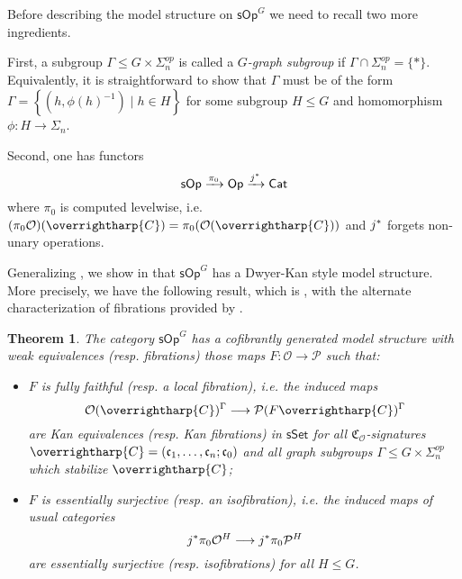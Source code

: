 \documentclass[a4paper,10pt
,draft
]{article}%
\numberwithin{equation}{section}
\numberwithin{figure}{section}
\newtheorem{theorem}[equation]{Theorem}%
\theoremstyle{definition} %
\newcommand{\sets}[2]{\left\{ #1 \;|\; #2\right\}}%
\newcommand{\longto}{\longrightarrow}%
\newcommand{\vect}[1]{\text{\overrightharp{\ensuremath{#1}}}}
\newcommand{\sSet}{\ensuremath{\mathsf{sSet}}}%
\newcommand{\sOp}{\ensuremath{\mathsf{sOp}}}%
\renewcommand{\O}{\ensuremath{\mathcal O}}
\renewcommand{\P}{\ensuremath{\mathcal P}}
\newcommand{\1}{\ensuremath{\mathbbm 1}}%
\begin{document}
Before describing the model structure on $\mathsf{sOp}^G$
we need to recall two more ingredients.

First, 
a subgroup $\Gamma \leq G \times \Sigma_n^{op}$
is called a \emph{$G$-graph subgroup}
if $\Gamma \cap \Sigma_n^{op} = \{*\}$.
Equivalently, it is straightforward to show
that $\Gamma$ must be of the form 
$\Gamma = \sets{(h,\phi(h)^{-1})}{h \in H}$
for some subgroup $H \leq G$
and homomorphism $\phi \colon H \to \Sigma_n$.

Second, one has functors
\[
	\mathsf{sOp} \xrightarrow{\pi_0}
	\mathsf{Op} \xrightarrow{j^{\**}}
	\mathsf{Cat}
\]
where $\pi_0$ is computed levelwise,
i.e. 
$(\pi_0 \O)(\vect{C}) = 
\pi_0(\O(\vect{C}))$
and
$j^{\**}$ forgets non-unary operations.


Generalizing \cite{Ber07b,CM13b},
we show in \cite{BP_HGOP}
that $\mathsf{sOp}^G$ 
has a Dwyer-Kan style model structure.
More precisely, we have the following result, which is
\cite[Thm. III]{BP_HGOP},
with the alternate characterization of fibrations 
provided by 
\cite[Prop. 4.78]{BP_HGOP}.



\begin{theorem}\label{SOPG_THM}
      The category $\sOp^G$ has a cofibrantly generated model structure with weak equivalences (resp. fibrations) those maps
      $F \colon \O \to \P$ such that:
\begin{itemize}
\item $F$ is \emph{fully faithful} (resp. a \emph{local fibration}), i.e. the induced maps
	\begin{equation}\label{DKEQUIV_EQ}
		\O ( \vect{C})^\Gamma \longto 
		\P(F \vect{C})^\Gamma
	\end{equation}
	are Kan equivalences (resp. Kan fibrations) in $\sSet$
	for all $\mathfrak C_\O$-signatures $\vect C = (\mathfrak c_1, \dots, \mathfrak c_n; \mathfrak c_0)$
	and all graph subgroups $\Gamma \leq G \times \Sigma_n^{op}$ which stabilize $\vect C$;
\item $F$ is \emph{essentially surjective} (resp. an \emph{isofibration}), i.e. the induced maps of usual categories
	\begin{equation}\label{ESSSURJ EQ}
		j^{\**}\pi_0 \O^H \longto j^{\**}\pi_0 \P^H
	\end{equation}
	are essentially surjective (resp. isofibrations) for all $H \leq G$.
\end{itemize}
\end{theorem}
\end{document}

